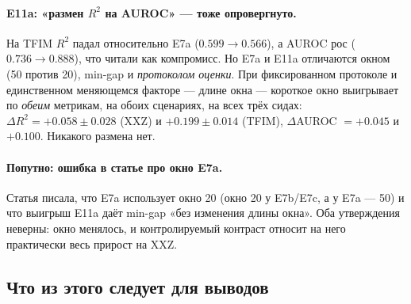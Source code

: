 \documentclass[12pt,a4paper]{article}
\begin{document}
\paragraph{E11a: «размен $R^2$ на AUROC» — \textbf{тоже опровергнуто}.}
На TFIM $R^2$ падал относительно E7a ($0.599\to 0.566$), а AUROC рос
($0.736\to 0.888$), что читали как компромисс. Но E7a и E11a отличаются окном
(50 против 20), min-gap и \emph{протоколом оценки}. При фиксированном протоколе
и единственном меняющемся факторе — длине окна — короткое окно выигрывает по
\emph{обеим} метрикам, на обоих сценариях, на всех трёх сидах:
$\Delta R^2 = +0.058 \pm 0.028$ (XXZ) и $+0.199 \pm 0.014$ (TFIM),
$\Delta$AUROC $= +0.045$ и $+0.100$. Никакого размена нет.

\paragraph{Попутно: ошибка в статье про окно E7a.} Статья писала, что E7a
использует окно 20 (окно 20 у E7b/E7c, а у E7a — 50) и что выигрыш E11a даёт
min-gap «без изменения длины окна». Оба утверждения неверны: окно менялось, и
контролируемый контраст относит на него практически весь прирост на XXZ.

\subsection{Что из этого следует для выводов}
\end{document}
